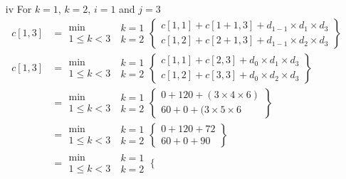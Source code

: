 \documentclass[12pt]{report}
\begin{document}
\begin{enumerate}
	\item[iv]For $k=1$, $k=2$, $i = 1$ and $j=3$
	\begin{align*}
		c[1,3]&=\substack{\text{min}\\1\le k < 3}~\begin{aligned}k=1\\k=2\end{aligned}
		\left\{
		\begin{aligned}
			c[1,1] + c[1+1,3] + d_{1-1} \times d_1\times d_3\\
			c[1,2] + c[2+1,3] + d_{1-1} \times d_2\times d_3
		\end{aligned}\right\}\\
		c[1,3]&=\substack{\text{min}\\1\le k < 3}~\begin{aligned}k=1\\k=2\end{aligned}
		\left\{
		\begin{aligned}
			c[1,1] + c[2,3] + d_{0} \times d_1\times d_3\\
			c[1,2] + c[3,3] + d_{0} \times d_2\times d_3
		\end{aligned}\right\}\\
		&=\substack{\text{min}\\1\le k < 3}~\begin{aligned}k=1\\k=2\end{aligned}
		\left\{
		\begin{aligned}
			0 + 120 + (3 \times 4\times 6)\\
			60 + 0 + (3 \times 5\times 6
		\end{aligned}\right\}\\
		&=\substack{\text{min}\\1\le k < 3}~\begin{aligned}k=1\\k=2\end{aligned}
		\left\{
		\begin{aligned}
			0 + 120 + 72\\
			60 + 0 + 90
		\end{aligned}\right\}\\
		&=\begin{aligned}\text{min}\\1\le k < 3\end{aligned}~\begin{aligned}k=1\\k=2\end{aligned}
		\left\{
		\begin{aligned}

\end{aligned}
\end{align*}
\end{enumerate}
\end{document}
